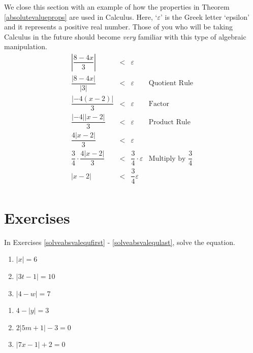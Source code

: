 \documentclass[11pt]{article}
\theoremstyle{definition}  %
\newcounter{HW}
\begin{document}
We close this section with an example of how the properties in Theorem \ref{absolutevalueprops} are used in Calculus.  Here, `$\varepsilon$' is the Greek letter `epsilon' and it represents a positive real number.  Those of you who will be taking Calculus in the future should become \emph{very} familiar with this type of algebraic manipulation.\[ \begin{array}{rclr}

\left| \dfrac{8-4x}{3} \right| & < & \varepsilon & \\ [12pt]

\dfrac{|8 - 4x|}{|3|} & < & \varepsilon & \text{Quotient Rule}\\ [12pt]

\dfrac{|-4(x-2)|}{3} & < & \varepsilon & \text{Factor} \\ [12pt]

\dfrac{|-4| |x-2|}{3} & < & \varepsilon & \text{Product Rule} \\ [12pt]

\dfrac{4 |x-2|}{3} & < & \varepsilon & \\ [12pt]

\dfrac{3}{4} \cdot \dfrac{4 |x-2|}{3} & < & \dfrac{3}{4} \cdot \varepsilon & \text{Multiply by $\dfrac{3}{4}$} \\ [12pt]

|x -2 | & < & \dfrac{3}{4} \varepsilon & \\  \end{array}\]

\newpage

\section{Exercises}

In Exercises \ref{solveabsvalequfirst} - \ref{solveabsvalequlast}, solve the equation.


\begin{multicols}{3}
\begin{enumerate}

\item  $|x| = 6$ \label{solveabsvalequfirst} 
\item $|3t-1| = 10$
\item $|4-w| = 7$

\setcounter{HW}{\value{enumi}}
\end{enumerate}
\end{multicols}

\begin{multicols}{3}
\begin{enumerate}
\setcounter{enumi}{\value{HW}}

\item  $4 - |y| = 3$
\item $2|5m+1| - 3 = 0$
\item $|7x-1| + 2 = 0$

\setcounter{HW}{\value{enumi}}
\end{enumerate}
\end{multicols}
\end{document}
